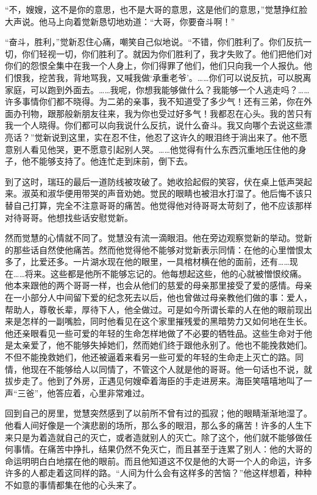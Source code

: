 \par “不，嫂嫂，这不是你的意思，也不是大哥的意思，这是他们的意思，”觉慧挣红脸大声说。他马上向着觉新恳切地劝道：“大哥，你要奋斗啊！”
\par “奋斗，胜利，”觉新忍住心痛，嘲笑自己似地说。“不错，你们胜利了。你们反抗一切，你们轻视一切，你们胜利了。就因为你们胜利了，我才失败了。他们把他们对你们的怨恨全集中在我一个人身上，你们得罪了他们，他们只向我一个人报仇。他们恨我，挖苦我，背地骂我，又喊我做‘承重老爷’。……你们可以说反抗，可以脱离家庭，可以跑到外面去。……我呢，你想我能够做什么？我能够一个人逃走吗？……许多事情你们都不晓得。为二弟的亲事，我不知道受了多少气！还有三弟，你在外面办刊物，跟那般新朋友往来，我为你也受过好多气！我都忍在心头。我的苦只有我一个人晓得。你们都可以向我说什么反抗，说什么奋斗。我又向哪个去说这些漂亮话？”觉新说到这里，实在忍不住，他忍了这许久的眼泪终于淌出来了。他不愿意别人看见他哭，更不愿意引起别人哭。……他觉得有什么东西沉重地压住他的身子，他不能够支持了。他连忙走到床前，倒下去。
\par 到了这时，瑞珏的最后一道防线被攻破了。她收拾起假的笑容，伏在桌上低声哭起来。淑英和淑华便用带哭的声音劝她。觉民的眼睛也被泪水打湿了。他后悔不该只替自己打算，完全不注意哥哥的痛苦。他觉得他对待哥哥太苛刻了，他不应该那样对待哥哥。他想找些话安慰觉新。
\par 然而觉慧的心情就不同了。觉慧没有流一滴眼泪。他在旁边观察觉新的举动。觉新的那些话自然使他痛苦。然而他觉得他不能够对觉新表示同情：在他的心里憎恨太多了，比爱还多。一片湖水现在他的眼里，一具棺材横在他的面前，还有……现在……将来。这些都是他所不能够忘记的。他每想起这些，他的心就被憎恨绞痛。他本来跟他的两个哥哥一样，也会从他们的慈爱的母亲那里接受了爱的感情。母亲在一小部分人中间留下爱的纪念死去以后，他也曾做过母亲教他们做的事：爱人，帮助人，尊敬长辈，厚待下人，他全做过。可是如今所谓长辈的人在他的眼前现出来是怎样的一副嘴脸，同时他看见在这个家里摧残爱的黑暗势力又如何地在生长。他还亲眼看见一些可爱的年轻的生命怎样地做了不必要的牺牲品。这些生命对于他是太亲爱了，他不能够失掉她们，然而她们终于跟他永别了。他也不能挽救她们。不但不能挽救她们，他还被逼着来看另一些可爱的年轻的生命走上灭亡的路。同情，他现在不能够给人以同情了，不管这个人就是他的哥哥。他一句话也不说，就拔步走了。他到了外房，正遇见何嫂牵着海臣的手走进房来。海臣笑嘻嘻地叫了一声“三爸”，他答应着，心里非常难过。
\par 回到自己的房里，觉慧突然感到了以前所不曾有过的孤寂；他的眼睛渐渐地湿了。他看人间好像是一个演悲剧的场所，那么多的眼泪，那么多的痛苦！许多的人生下来只是为着造就自己的灭亡，或者造就别人的灭亡。除了这个，他们就不能够做任何事情。在痛苦中挣扎，结果仍然不免灭亡，而且甚至于连累了别人：他的大哥的命运明明白白地摆在他的眼前。而且他知道这不仅是他的大哥一个人的命运，许多许多的人都走着这同样的路。“人间为什么会有这样多的苦恼？”他这样想着，种种不如意的事情都集在他的心头来了。
